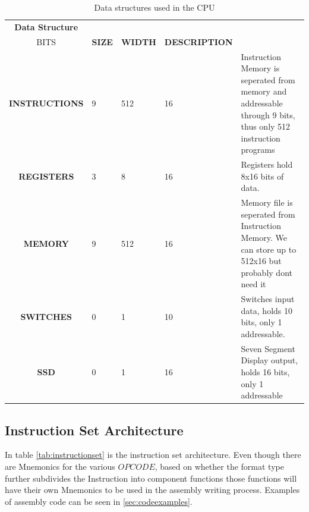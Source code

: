 \documentclass{article}
\begin{document}
\begin{table}[H]
\centering
\begin{tabularx}{\linewidth}{|c|l|l|l|>{\raggedright\arraybackslash}X|}
\hline
\textbf{Data Structure} & \textbf{\begin{tabular}[c]{@{}l@{}}ADDRESS\\ BITS\end{tabular}} & \textbf{SIZE} & \textbf{WIDTH} & \textbf{DESCRIPTION}                                                                                           \\ \hline
\rowcolor[HTML]{D9E1F2} 
\textbf{INSTRUCTIONS}   & 9                                                               & 512           & 16             & Instruction Memory is seperated from memory and addressable through 9 bits, thus only 512 instruction programs \\ \hline
\rowcolor[HTML]{FCE4D6} 
\textbf{REGISTERS}      & 3                                                               & 8             & 16             & Registers hold 8x16 bits of data.                                                                              \\ \hline
\rowcolor[HTML]{FFF2CC} 
\textbf{MEMORY}         & 9                                                               & 512           & 16             & Memory file is seperated from Instruction Memory. We can store up to 512x16 but probably dont need it          \\ \hline
\rowcolor[HTML]{E2EFDA} 
\textbf{SWITCHES}       & 0                                                               & 1             & 10             & Switches input data, holds 10 bits, only 1 addressable.                                                        \\ \hline
\rowcolor[HTML]{D6DCE4} 
\textbf{SSD}            & 0                                                               & 1             & 16             & Seven Segment Display output, holds 16 bits, only 1 addressable                                                \\ \hline
\end{tabularx}
\caption{Data structures used in the CPU}
\label{datas}
\end{table}
%
%
%  
\subsection{Instruction Set Architecture}
In table \ref{tab:instructionset} is the instruction set architecture. Even though there are Mnemonics for the various $OPCODE$, based on whether the format type further subdivides the Instruction into component functions those functions will have their own Mnemonics to be used in the assembly writing process. Examples of assembly code can be seen in \ref{sec:codeexamples}.
\end{document}

